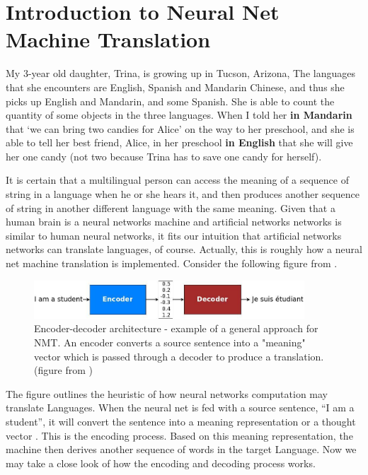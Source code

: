 \documentclass[final]{ua-thesis}
\numberwithin{equation}{section}
\begin{document}
\section{Introduction to Neural Net Machine Translation}

My 3-year old daughter, Trina, is growing up in Tucson, Arizona, The languages that she encounters are English, Spanish and Mandarin Chinese, and thus she picks up English and Mandarin, and some Spanish. She is able to count the quantity of some objects in the three languages. When I told her \textbf{in  Mandarin} that `we can bring two candies for Alice' on the way to her preschool, and she is able to tell her best friend, Alice, in her preschool \textbf{in English} that she will give her one candy (not two because Trina has to save one candy for herself).         

It is certain that a multilingual person can access the meaning of a sequence of string in a language when he or she hears it, and then produces another sequence of string in another different language with the same meaning. Given that a human brain is a neural networks machine and artificial networks networks is similar to human neural networks, it fits our intuition that artificial networks networks can translate languages, of course. Actually, this is roughly how a neural net machine translation is implemented. Consider the following figure from \citet{luong17GitHub}.

\begin{figure}[h]
\caption{Encoder-decoder architecture - example of a general approach for NMT. An encoder converts a source sentence into a "meaning" vector which is passed through a decoder to produce a translation. (figure from \citet{luong17GitHub})}
\centering
\includegraphics[width=0.9\textwidth]{encdec.jpg}
\end{figure} 

The figure outlines the heuristic of how neural networks computation may translate Languages. When the neural net is fed with a source sentence, ``I am a student'', it will convert the sentence into a meaning representation or a thought vector \citep{devlin2015google}. This is the encoding process. Based on this meaning representation, the machine then derives another sequence of words in the target Language. Now we may take a close look of how the encoding and decoding process works. 
\end{document}
